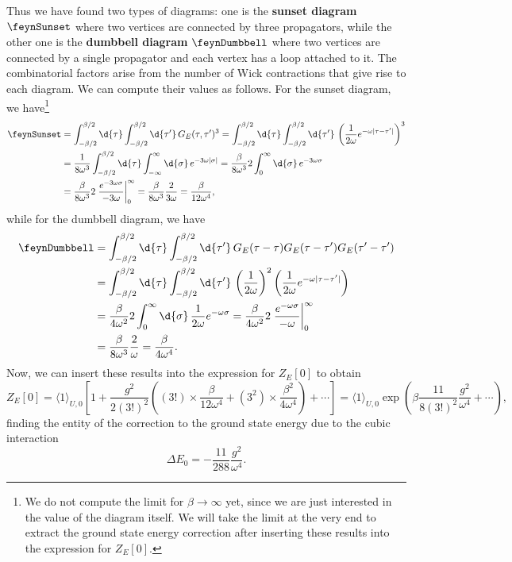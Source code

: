 Thus we have found two types of diagrams: one is the \textbf{sunset diagram} \(\feynSunset\) where two vertices are connected by three propagators, while the other one is the \textbf{dumbbell diagram} \(\feynDumbbell\) where two vertices are connected by a single propagator and each vertex has a loop attached to it. The combinatorial factors arise from the number of Wick contractions that give rise to each diagram. We can compute their values as follows. For the sunset diagram, we have\footnote{We do not compute the limit for \(\beta \to \infty\) yet, since we are just interested in the value of the diagram itself. We will take the limit at the very end to extract the ground state energy correction after inserting these results into the expression for \(Z_E[0]\).}
\[
    \begin{aligned}
        \feynSunset & = \int_{-\beta/2}^{\beta/2} \d{\tau} \int_{-\beta/2}^{\beta/2} \d{\tau^{\prime}} \, G_E(\tau,\tau^{\prime})^3 = \int_{-\beta/2}^{\beta/2} \d{\tau} \int_{-\beta/2}^{\beta/2} \d{\tau^{\prime}} \, \left( \frac{1}{2\omega} e^{-\omega \vert \tau - \tau^{\prime} \vert} \right)^3 \\
                    & = \frac{1}{8\omega^3} \int_{-\beta/2}^{\beta/2} \d{\tau} \int_{-\infty}^{\infty} \d{\sigma} \, e^{-3\omega \vert \sigma \vert} = \frac{\beta}{8\omega^3} 2 \int_{0}^{\infty} \d{\sigma} \, e^{-3\omega \sigma}                                                                    \\
                    & = \frac{\beta}{8\omega^3} 2 \left. \frac{e^{-3\omega \sigma}}{-3\omega} \right|_0^\infty = \frac{\beta}{8\omega^3}\frac{2}{3\omega} = \frac{\beta}{12\omega^4},
    \end{aligned}
\]
while for the dumbbell diagram, we have
\[
    \begin{aligned}
        \feynDumbbell & = \int_{-\beta/2}^{\beta/2} \d{\tau} \int_{-\beta/2}^{\beta/2} \d{\tau^{\prime}} \, G_E(\tau-\tau) G_E(\tau - \tau^{\prime}) G_E(\tau^{\prime} - \tau^{\prime})                                      \\
                      & = \int_{-\beta/2}^{\beta/2} \d{\tau} \int_{-\beta/2}^{\beta/2} \d{\tau^{\prime}} \, \left( \frac{1}{2\omega} \right)^2 \left( \frac{1}{2\omega} e^{-\omega \vert \tau - \tau^{\prime} \vert} \right) \\
                      & = \frac{\beta}{4\omega^2} 2 \int_{0}^{\infty} \d{\sigma} \, \frac{1}{2\omega} e^{-\omega \sigma} = \frac{\beta}{4\omega^2} 2 \left. \frac{e^{-\omega \sigma}}{-\omega} \right|_0^\infty              \\
                      & = \frac{\beta}{8\omega^3}\frac{2}{\omega} = \frac{\beta}{4\omega^4}.
    \end{aligned}
\]
Now, we can insert these results into the expression for \(Z_E[0]\) to obtain
\[
    Z_E[0] = \langle 1 \rangle_{U,0} \left[ 1 + \frac{g^2}{2(3!)^2} \left( (3!) \times \frac{\beta}{12\omega^4} + (3^2) \times \frac{\beta^2}{4\omega^4} \right) + \cdots \right] = \langle 1 \rangle_{U,0} \exp\left( \beta \frac{11}{8(3!)^2} \frac{g^2}{\omega^4} + \cdots \right),
\]
finding the entity of the correction to the ground state energy due to the cubic interaction
\[
    \Delta E_0 = - \frac{11}{288} \frac{g^2}{\omega^4}.
\]

